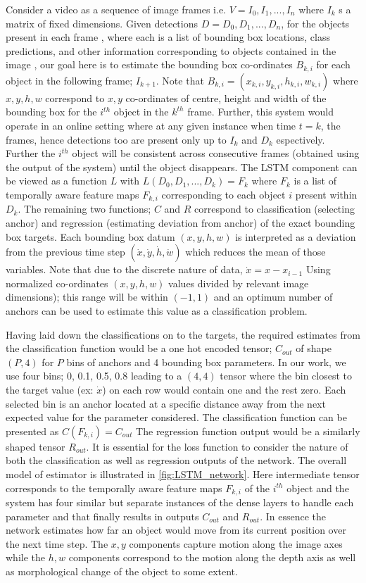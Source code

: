 Consider a video as a sequence of image frames i.e. $V = I_{0},I_{1},...,I_{n}$ where $I_{k}$ s a matrix of fixed dimensions. Given detections $D = D_{0},D_{1},...,D_{n}$, for the objects present in each frame , where each  is a list of bounding box locations, class predictions, and other information corresponding to objects contained in the image , our goal here is to estimate the bounding box co-ordinates $B_{k,i}$ for each object in the following frame; $I_{k+1}$. Note that  $B_{k,i} = (x_{k,i},y_{k,i},h_{k,i},w_{k,i})$ where $x,y,h,w$ correspond to $x,y$ co-ordinates of centre, height and width of the bounding box for the $i^{th}$ object in the $k^{th}$ frame. Further, this system would operate in an online setting where at any given instance when time $t = k$, the frames, hence detections too are present only up to $I_{k}$ and $D_{k}$ espectively. Further the $i^{th}$ object will be consistent across consecutive frames (obtained using the output of the system) until the object disappears. The LSTM component can be viewed as a function $L$ with $L(D_{0},D_{1},...,D_{k}) = F_{k}$ where $F_{k}$ is a list of temporally aware feature maps $F_{k,i}$ corresponding to each object $i$ present within $D_{k}$. The remaining two functions; $C$ and $R$ correspond to classification (selecting anchor) and regression (estimating deviation from anchor) of the exact bounding box targets. Each bounding box datum $(x,y,h,w)$ is interpreted as a deviation from the previous time step $(\dot{x},\dot{y},\dot{h},\dot{w})$ which reduces the mean of those variables. Note that due to the discrete nature of data, $\dot{x} = x - x_{i-1}$ Using normalized co-ordinates $(x,y,h,w)$ values divided by relevant image dimensions); this range will be within $(-1, 1)$ and an optimum number of anchors can be used to estimate this value as a classification problem. 
\par Having laid down the classifications on to the targets, the required estimates from the classification function would be a one hot encoded tensor; $C_{out}$ of shape $(P, 4)$ for $P$ bins of anchors and 4 bounding box parameters. In our work, we use four bins; 0, 0.1, 0.5, 0.8 leading to a $(4, 4)$ tensor where the bin closest to the target value (ex: $\dot{x}$)  on each row would contain one and the rest zero. Each selected bin is an anchor located at a specific distance away from the next expected value for the parameter considered. The classification function can be presented as $C(F_{k,i}) = C_{out}$ The regression function output would be a similarly shaped tensor $R_{out}$. It is essential for the loss function to consider the nature of both the classification as well as regression outputs of the network. The overall model of estimator is illustrated in \ref{fig:LSTM_network}. Here intermediate tensor corresponds to the temporally aware feature maps $F_{k,i}$ of the $i^{th}$ object and the system has four similar but separate instances of the dense layers to handle each parameter and that finally results in outputs $C_{out}$ and $R_{out}$. In essence the network estimates how far an object would move from its current position over the next time step. The $x,y$ components capture motion along the image axes while the $h,w$ components correspond to the motion along the depth axis as well as morphological change of the object to some extent. 
